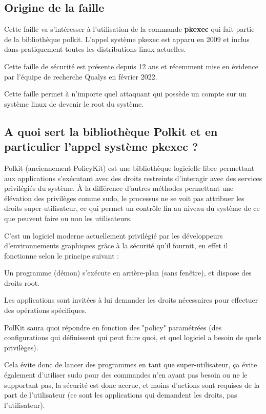 \documentclass[12pt,a4paper]{article}
\begin{document}
		\subsection{Origine de la faille}   
   		\begin{flushleft}
   			\noindent Cette faille va s'intéresser à l'utilisation de la commande \textbf{pkexec} qui fait partie de la bibliothèque polkit. L'appel système pkexec est apparu en 2009 et inclus dans pratiquement toutes les distributions linux actuelles.
   			\item Cette faille de sécurité est présente depuis 12 ans et récemment mise en évidence par l'équipe de recherche Qualys en février 2022. \cite{qualys}
   			\item Cette faille permet à n’importe quel attaquant qui possède un compte sur un système linux de devenir le root du système.
            \subsection{A quoi sert la bibliothèque Polkit et en particulier l'appel système pkexec ? }
            \begin{flushleft}
                \noindent Polkit (anciennement PolicyKit) est une bibliothèque logicielle libre permettant aux applications s'exécutant avec des droits restreints d'interagir avec des services privilégiés du système. À la différence d'autres méthodes permettant une élévation des privilèges comme sudo, le processus ne se voit pas attribuer les droits super-utilisateur, ce qui permet un contrôle fin au niveau du système de ce que peuvent faire ou non les utilisateurs. \cite{policyki47:online}
                \item C'est un logiciel moderne actuellement privilégié par les développeurs d'environnements graphiques grâce à la sécurité qu'il fournit, en effet il fonctionne selon le principe suivant : 
                \item Un programme (démon) s'exécute en arrière-plan (sans fenêtre), et dispose des droits root.
                \item Les applications sont invitées à lui demander les droits nécessaires pour effectuer des opérations spécifiques.
                \item PolKit saura quoi répondre en fonction des "policy" paramétrées (des configurations qui définissent qui peut faire quoi, et quel logiciel a besoin de quels privilèges).
                \item Cela évite donc de lancer des programmes en tant que super-utilisateur, ça évite également d'utiliser sudo pour des commandes n'en ayant pas besoin ou ne le supportant pas, la sécurité est donc accrue, et moins d'actions sont requises de la part de l'utilisateur (ce sont les applications qui demandent les droits, pas l'utilisateur).


\end{flushleft}
\end{flushleft}
\end{document}
